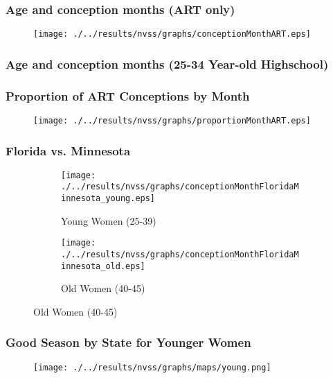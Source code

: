 \documentclass[10pt,letterpaper,subeqn]{beamer}
\begin{document}
\begin{frame}
\frametitle{Age and conception months (ART only)}
\begin{figure}[htpb!]
  \texttt{[image: ./../results/nvss/graphs/conceptionMonthART.eps]}
\end{figure}
\end{frame}

\begin{frame}
\frametitle{Age and conception months (25-34 Year-old Highschool)}
\end{frame}

\begin{frame}
\frametitle{Proportion of ART Conceptions by Month}
\begin{figure}[htpb!]
  \texttt{[image: ./../results/nvss/graphs/proportionMonthART.eps]}
\end{figure}
\end{frame}


\begin{frame}
\frametitle{Florida vs. Minnesota}
\begin{figure}[htpb!]
\begin{center}
\begin{subfigure}{.5\textwidth}
  \centering
  \texttt{[image: ./../results/nvss/graphs/conceptionMonthFloridaMinnesota\_young.eps]}
  \caption{Young Women (25-39)}
  \label{fig:conceptionsStatesYoung}
\end{subfigure}%
\begin{subfigure}{.5\textwidth}
  \centering
  \texttt{[image: ./../results/nvss/graphs/conceptionMonthFloridaMinnesota\_old.eps]}
  \caption{Old Women (40-45)}
  \label{fig:conceptionsStatesOld}
\end{subfigure}
\end{center}
\end{figure}
\end{frame}






\begin{frame}
\frametitle{Good Season by State for Younger Women}
\begin{figure}[htpb!]
\begin{center}
  \centering
  \texttt{[image: ./../results/nvss/graphs/maps/young.png]}
  \label{fig:mapYoung}
\end{center}
\end{figure}
\end{frame}
\end{document}
